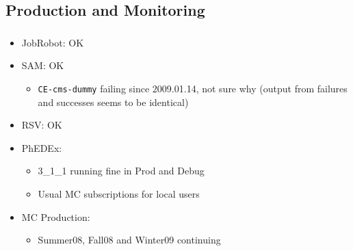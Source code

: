 \documentclass{beamer}
\begin{document}
\subsection{Production and Monitoring}
\begin{frame}
\frametitle{}
\begin{itemize}
     \item JobRobot: OK
     \item SAM: OK
     \begin{itemize}
        \item {\tt CE-cms-dummy} failing since 2009.01.14, not sure why (output from failures and successes seems to be identical)
     \end{itemize}
     \item RSV: OK
     \item PhEDEx:
     \begin{itemize}
        \item 3\_1\_1 running fine in Prod and Debug
        \item Usual MC subscriptions for local users
     \end{itemize}
     \item MC Production:
     \begin{itemize}
        \item Summer08, Fall08 and Winter09 continuing
     \end{itemize}
\end{itemize}
\end{frame}
\end{document}
